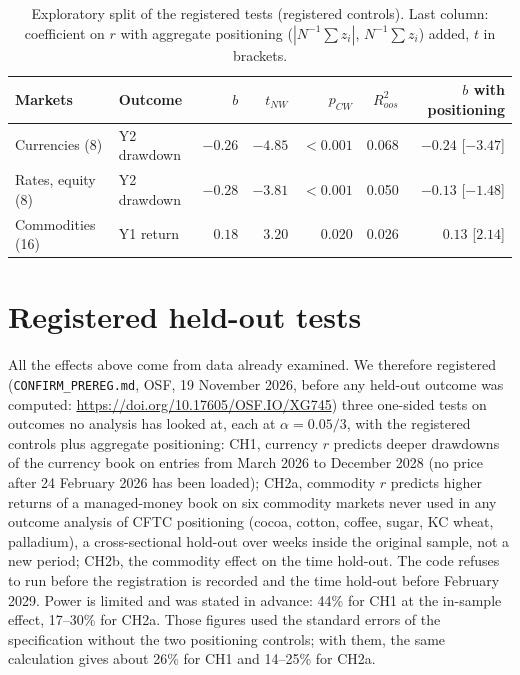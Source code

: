 \documentclass[preprint,12pt,authoryear]{elsarticle}
\begin{document}
\begin{table}[t]
\centering
\caption{Exploratory split of the registered tests (registered controls).
Last column: coefficient on $r$ with aggregate positioning
($|N^{-1}\sum z_i|$, $N^{-1}\sum z_i$) added, $t$ in brackets.}
\label{tab:sub}
\footnotesize\setlength{\tabcolsep}{3.5pt}
\begin{tabular}{llrrrrr}
\toprule
Markets & Outcome & $b$ & $t_{NW}$ & $p_{CW}$ & $R^2_{oos}$ & $b$ with positioning \\
\midrule
Currencies (8) & Y2 drawdown & $-0.26$ & $-4.85$ & $<0.001$ & 0.068 & $-0.24$ [$-3.47$] \\
Rates, equity (8) & Y2 drawdown & $-0.28$ & $-3.81$ & $<0.001$ & 0.050 & $-0.13$ [$-1.48$] \\
Commodities (16) & Y1 return & $0.18$ & $3.20$ & 0.020 & 0.026 & $0.13$ [$2.14$] \\
\bottomrule
\end{tabular}
\end{table}

\section{Registered held-out tests}

All the effects above come from data already examined. We therefore
registered (\texttt{CONFIRM\_PREREG.md}, OSF, 19 November 2026, before any
held-out outcome was computed: \url{https://doi.org/10.17605/OSF.IO/XG745})
three one-sided tests on
outcomes no analysis has looked at, each at $\alpha = 0.05/3$, with the
registered controls plus aggregate positioning: CH1, currency $r$ predicts
deeper drawdowns of the currency book on entries from March 2026 to December
2028 (no price after 24 February 2026 has been loaded); CH2a, commodity $r$
predicts higher returns of a managed-money book on six commodity markets never
used in any outcome analysis of CFTC positioning (cocoa, cotton, coffee,
sugar, KC wheat, palladium), a cross-sectional hold-out over weeks inside the
original sample, not a new period; CH2b, the commodity effect on the time hold-out. The code refuses
to run before the registration is recorded and the time hold-out before
February 2029. Power is limited and was stated in advance: 44\% for CH1 at
the in-sample effect, 17--30\% for CH2a. Those figures used the standard
errors of the specification without the two positioning controls; with them,
the same calculation gives about 26\% for CH1 and 14--25\% for CH2a.
\end{document}
